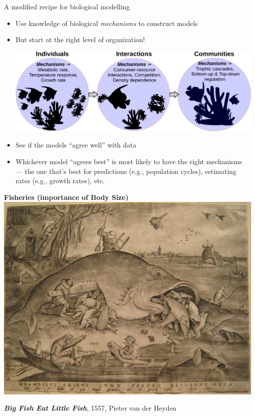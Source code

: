 \documentclass[xcolor={usenames,x11names},compress]{beamer}
\renewcommand{\(}{\begin{columns}}
\renewcommand{\)}{\end{columns}}
\newcommand{\<}[1]{\begin{column}{#1}}
\renewcommand{\>}{\end{column}}
\begin{document}
\begin{frame}{A modified recipe for biological modelling}

  \begin{itemize}[<+->] \itemsep6pt
    \item Use knowledge of biological {\it mechanisms} to construct models
    \item But start at the right level of organization! 
      \begin{center}
	\includegraphics[width=.6\textwidth]{Mechanisms.pdf}
      \end{center} 
    \item See if the models ``agree well'' with data
    \item Whichever model ``agrees best'' is most likely to have the right 
      mechanisms --- the one that's best for predictions (e.g., population 
      cycles), estimating rates (e.g., growth rates), etc.
  \end{itemize}

\end{frame}

\begin{frame}[plain]{}

  \centering

  {\LARGE \bf Fisheries (importance of Body Size)}\\
  \vspace{10pt}
  \includegraphics[width=.7\textwidth]{Pieter_Fish.jpg}

  \vspace{4pt}

  {\small {\bf \it Big Fish Eat Little Fish}, 1557, Pieter van der Heyden}
\end{frame}
\end{document}
